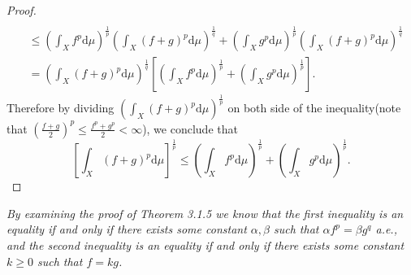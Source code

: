 \begin{proof}
$$\begin{aligned}
\\
&\le \left( \int_X{f^p\mathrm{d}\mu} \right) ^{\frac{1}{p}}\left( \int_X{\left( f+g \right) ^p\mathrm{d}\mu} \right) ^{\frac{1}{q}}+\left( \int_X{g^p\mathrm{d}\mu} \right) ^{\frac{1}{p}}\left( \int_X{\left( f+g \right) ^p\mathrm{d}\mu} \right) ^{\frac{1}{q}}
\\
&=\left( \int_X{\left( f+g \right) ^p\mathrm{d}\mu} \right) ^{\frac{1}{q}}\left[ \left( \int_X{f^p\mathrm{d}\mu} \right) ^{\frac{1}{p}}+\left( \int_X{g^p\mathrm{d}\mu} \right) ^{\frac{1}{p}} \right] .
\end{aligned}
$$
Therefore by dividing $\left(\int_X(f+g)^p\mathrm{d}\mu\right)^{\frac{1}{p}}$ on both side of the inequality(note that $\left( \frac{f+g}{2} \right) ^p\le \frac{f^p+g^p}{2}<\infty $), we conclude that 
$$
\left[ \int_X{\left( f+g \right) ^p\mathrm{d}\mu} \right] ^{\frac{1}{p}}\le \left( \int_X{f^p\mathrm{d}\mu} \right) ^{\frac{1}{p}}+\left( \int_X{g^p\mathrm{d}\mu} \right) ^{\frac{1}{p}}.
$$
\end{proof}
\begin{note}\em
By examining the proof of Theorem 3.1.5 we know that the first inequality is an equality if and only if there exists some constant $\alpha,\beta$ such that $\alpha f^p=\beta g^q$ a.e., and the second inequality is an equality if and only if there exists some constant $k\ge0$ such that $f=kg$.
\end{note}

